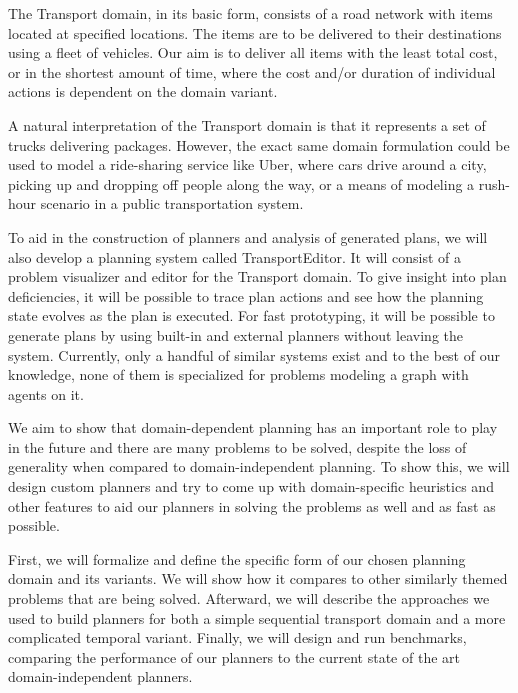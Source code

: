 The Transport domain, in its basic form, consists of a road network with items located at specified locations. The items are to be delivered to their destinations
using a fleet of vehicles. Our aim is to deliver all items
with the least total cost, or in the shortest amount of time,
where the cost and/or duration of individual actions is dependent on the domain variant.

A natural interpretation of the Transport domain is that it represents a set of trucks
delivering packages. However,
the exact same domain formulation could be used to
model a ride-sharing service like Uber, where cars drive around a city, picking up and dropping off people along the way, or
a means of modeling a rush-hour scenario in a public transportation system.

To aid in the construction of planners and analysis of generated
plans, we will also develop a planning system called TransportEditor. It will consist of a problem visualizer and editor for the Transport domain. To give insight into plan deficiencies, it will be possible to trace plan actions and see how the planning
state evolves as the plan is executed. For fast prototyping,
it will be possible to generate plans by using built-in and external planners without leaving the system. Currently, only a handful of similar systems exist and to the best of our knowledge, none of them is specialized for problems modeling a graph with agents on it.

We aim to show that domain-dependent planning has an important
role to play in the future and there are many problems to be solved,
despite the loss of generality when compared to domain-independent planning.
To show this, we will design custom planners
and try to come up with domain-specific heuristics and other features
to aid our planners in solving the problems as well and as fast as
possible.

First, we will formalize and define the specific form of our
chosen planning domain and its variants. We will show how
it compares to other similarly themed problems that are being
solved. Afterward, we will describe the approaches we used
to build planners for both a
simple sequential transport domain and a more complicated
temporal variant. Finally, we will design and run benchmarks,
comparing the performance of our planners to the current
state of the art domain-independent planners.

